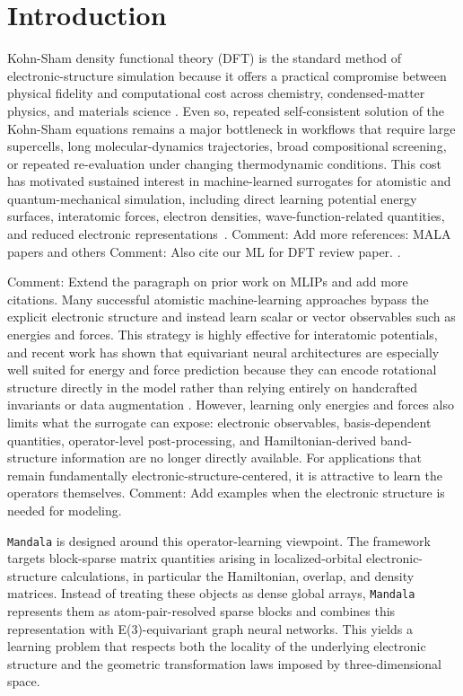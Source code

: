 \section{Introduction}
\label{sec:introduction}

Kohn-Sham density functional theory (DFT) is the standard method of electronic-structure simulation because it offers a practical compromise between physical fidelity and computational cost across chemistry, condensed-matter physics, and materials science \cite{HoKo1964,KoSh1965}. Even so, repeated self-consistent solution of the Kohn-Sham equations remains a major bottleneck in workflows that require large supercells, long molecular-dynamics trajectories, broad compositional screening, or repeated re-evaluation under changing thermodynamic conditions. This cost has motivated sustained interest in machine-learned surrogates for atomistic and quantum-mechanical simulation, including direct learning potential energy surfaces, interatomic forces, electron densities, wave-function-related quantities, and reduced electronic representations~\cite{Cangi:2025aa}.
Comment: Add more references: MALA papers and others
Comment: Also cite our ML for DFT review paper.
\cite{BrVo2017,chandrasekaran_solving_2019,TsMi2020,Shao_2023}.

Comment: Extend the paragraph on prior work on MLIPs and add more citations.
Many successful atomistic machine-learning approaches bypass the explicit electronic structure and instead learn scalar or vector observables such as energies and forces.
This strategy is highly effective for interatomic potentials, and recent work has shown that equivariant neural architectures are especially well suited for energy and force prediction because they can encode rotational structure directly in the model rather than relying entirely on handcrafted invariants or data augmentation \cite{KoKoBe22,Rackers_2023}. However, learning only energies and forces also limits what the surrogate can expose: electronic observables, basis-dependent quantities, operator-level post-processing, and Hamiltonian-derived band-structure information are no longer directly available. For applications that remain fundamentally electronic-structure-centered, it is attractive to learn the operators themselves.
Comment: Add examples when the electronic structure is needed for modeling.

\texttt{Mandala} is designed around this operator-learning viewpoint. The framework targets block-sparse matrix quantities arising in localized-orbital electronic-structure calculations, in particular the Hamiltonian, overlap, and density matrices. Instead of treating these objects as dense global arrays, \texttt{Mandala} represents them as atom-pair-resolved sparse blocks and combines this representation with E(3)-equivariant graph neural networks. This yields a learning problem that respects both the locality of the underlying electronic structure and the geometric transformation laws imposed by three-dimensional space.

